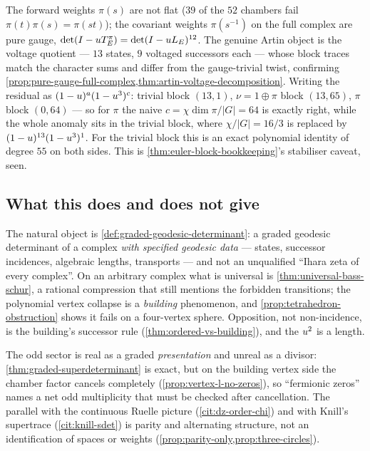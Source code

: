 \begin{numerical}
\label{num:a2-voltage-euler}
The forward weights $\pi(s)$ are not flat ($39$ of the $52$ chambers fail
$\pi(t)\pi(s) = \pi(st)$); the covariant weights $\pi(s^{-1})$ on the full
complex are pure gauge, $\det(I-u T^\pi_E) = \det(I-u L_E)^{12}$. The
genuine Artin object is the voltage quotient --- $13$ states, $9$ voltaged
successors each --- whose block traces match the character sums and differ from
the gauge-trivial twist, confirming
\cref{prop:pure-gauge-full-complex,thm:artin-voltage-decomposition}. Writing the
residual as $(1-u)^a(1-u^3)^c$: trivial block $(13,1)$, $\nu = 1\oplus\pi$
block $(13,65)$, $\pi$ block $(0,64)$ --- so for $\pi$ the naive
$c = \chi\dim\pi/|G| = 64$ is exactly right, while the whole anomaly sits in the
trivial block, where $\chi/|G| = 16/3$ is replaced by
$(1-u)^{13}(1-u^3)^1$. For the trivial block this is an exact polynomial
identity of degree $55$ on both sides. This is
\cref{thm:euler-block-bookkeeping}'s stabiliser caveat, seen.
\end{numerical}

\subsection{What this does and does not give}

The natural object is \cref{def:graded-geodesic-determinant}: a graded geodesic
determinant of a complex \emph{with specified geodesic data} --- states,
successor incidences, algebraic lengths, transports --- and not an unqualified
``Ihara zeta of every complex''. On an arbitrary complex what is universal is
\cref{thm:universal-bass-schur}, a rational compression that still mentions the
forbidden transitions; the polynomial vertex collapse is a \emph{building}
phenomenon, and \cref{prop:tetrahedron-obstruction} shows it fails on a
four-vertex sphere. Opposition, not non-incidence, is the building's successor
rule (\cref{thm:ordered-vs-building}), and the $u^2$ is a length.

The odd sector is real as a graded \emph{presentation} and unreal as a divisor:
\cref{thm:graded-superdeterminant} is exact, but on the building vertex side the
chamber factor cancels completely (\cref{prop:vertex-l-no-zeros}), so ``fermionic
zeros'' names a net odd multiplicity that must be checked after cancellation.
The parallel with the continuous Ruelle picture (\cref{cit:dz-order-chi}) and
with Knill's supertrace (\cref{cit:knill-sdet}) is parity and alternating
structure, not an identification of spaces or weights
(\cref{prop:parity-only,prop:three-circles}).

